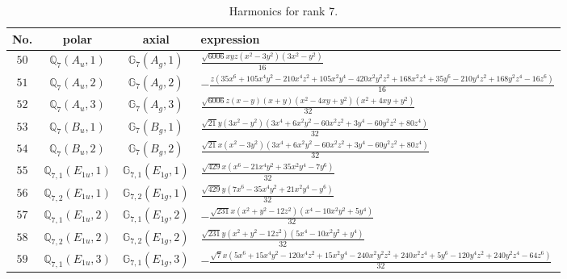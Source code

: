 \documentclass[fleqn,8pt,landscape]{jsarticle}
\begin{document}
\begin{table}[ht!]
\begin{center}
\caption{Harmonics for rank 7.}
\renewcommand{\arraystretch}{1.3}
\begin{tabular}{cccl} \hline \hline
No. & polar & axial & expression \\ \hline
$ 50 $ & $ \mathbb{Q}_{7}(A_{u},1) $ & $ \mathbb{G}_{7}(A_{g},1) $ & $ \frac{\sqrt{6006} x y z \left(x^{2} - 3 y^{2}\right) \left(3 x^{2} - y^{2}\right)}{16} $ \\
$ 51 $ & $ \mathbb{Q}_{7}(A_{u},2) $ & $ \mathbb{G}_{7}(A_{g},2) $ & $ - \frac{z \left(35 x^{6} + 105 x^{4} y^{2} - 210 x^{4} z^{2} + 105 x^{2} y^{4} - 420 x^{2} y^{2} z^{2} + 168 x^{2} z^{4} + 35 y^{6} - 210 y^{4} z^{2} + 168 y^{2} z^{4} - 16 z^{6}\right)}{16} $ \\
$ 52 $ & $ \mathbb{Q}_{7}(A_{u},3) $ & $ \mathbb{G}_{7}(A_{g},3) $ & $ \frac{\sqrt{6006} z \left(x - y\right) \left(x + y\right) \left(x^{2} - 4 x y + y^{2}\right) \left(x^{2} + 4 x y + y^{2}\right)}{32} $ \\
$ 53 $ & $ \mathbb{Q}_{7}(B_{u},1) $ & $ \mathbb{G}_{7}(B_{g},1) $ & $ \frac{\sqrt{21} y \left(3 x^{2} - y^{2}\right) \left(3 x^{4} + 6 x^{2} y^{2} - 60 x^{2} z^{2} + 3 y^{4} - 60 y^{2} z^{2} + 80 z^{4}\right)}{32} $ \\
$ 54 $ & $ \mathbb{Q}_{7}(B_{u},2) $ & $ \mathbb{G}_{7}(B_{g},2) $ & $ \frac{\sqrt{21} x \left(x^{2} - 3 y^{2}\right) \left(3 x^{4} + 6 x^{2} y^{2} - 60 x^{2} z^{2} + 3 y^{4} - 60 y^{2} z^{2} + 80 z^{4}\right)}{32} $ \\
$ 55 $ & $ \mathbb{Q}_{7,1}(E_{1u},1) $ & $ \mathbb{G}_{7,1}(E_{1g},1) $ & $ \frac{\sqrt{429} x \left(x^{6} - 21 x^{4} y^{2} + 35 x^{2} y^{4} - 7 y^{6}\right)}{32} $ \\
$ 56 $ & $ \mathbb{Q}_{7,2}(E_{1u},1) $ & $ \mathbb{G}_{7,2}(E_{1g},1) $ & $ \frac{\sqrt{429} y \left(7 x^{6} - 35 x^{4} y^{2} + 21 x^{2} y^{4} - y^{6}\right)}{32} $ \\
$ 57 $ & $ \mathbb{Q}_{7,1}(E_{1u},2) $ & $ \mathbb{G}_{7,1}(E_{1g},2) $ & $ - \frac{\sqrt{231} x \left(x^{2} + y^{2} - 12 z^{2}\right) \left(x^{4} - 10 x^{2} y^{2} + 5 y^{4}\right)}{32} $ \\
$ 58 $ & $ \mathbb{Q}_{7,2}(E_{1u},2) $ & $ \mathbb{G}_{7,2}(E_{1g},2) $ & $ \frac{\sqrt{231} y \left(x^{2} + y^{2} - 12 z^{2}\right) \left(5 x^{4} - 10 x^{2} y^{2} + y^{4}\right)}{32} $ \\
$ 59 $ & $ \mathbb{Q}_{7,1}(E_{1u},3) $ & $ \mathbb{G}_{7,1}(E_{1g},3) $ & $ - \frac{\sqrt{7} x \left(5 x^{6} + 15 x^{4} y^{2} - 120 x^{4} z^{2} + 15 x^{2} y^{4} - 240 x^{2} y^{2} z^{2} + 240 x^{2} z^{4} + 5 y^{6} - 120 y^{4} z^{2} + 240 y^{2} z^{4} - 64 z^{6}\right)}{32} $ \\

\end{tabular}
\end{center}
\end{table}
\end{document}
